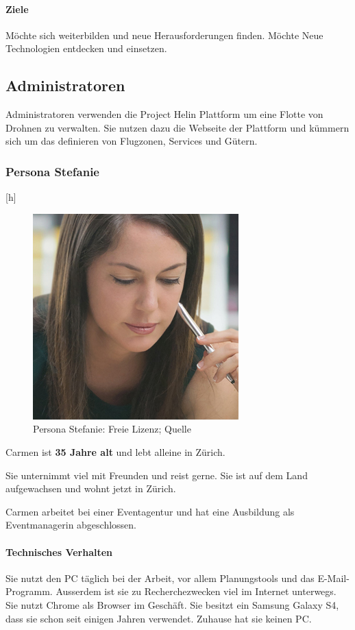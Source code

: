 \paragraph{Ziele} 

Möchte sich weiterbilden und neue Herausforderungen finden. Möchte Neue Technologien entdecken und einsetzen.\\

\subsection{Administratoren}

Administratoren verwenden die Project Helin Plattform um eine Flotte von Drohnen zu verwalten. Sie nutzen dazu die Webseite der Plattform und kümmern sich um das definieren von Flugzonen, Services und Gütern.

\subsubsection{Persona Stefanie}[h]
\begin{figure}
	\includegraphics[width=.35\textwidth]{images/persona-stefanie.jpg} 
	\caption{Persona Stefanie: Freie Lizenz; Quelle} %
	\label{fig:stefanie}
\end{figure}


Carmen ist \textbf{35 Jahre alt} und lebt alleine in Zürich.

Sie unternimmt viel mit Freunden und reist gerne. Sie ist auf dem Land aufgewachsen und wohnt jetzt in Zürich. 

Carmen arbeitet bei einer Eventagentur und hat eine Ausbildung als Eventmanagerin abgeschlossen.

\paragraph{Technisches Verhalten} 
Sie nutzt den PC täglich bei der Arbeit, vor allem Planungstools und das E-Mail-Programm. Ausserdem ist sie zu Recherchezwecken viel im Internet unterwegs. Sie nutzt Chrome als Browser im Geschäft. Sie besitzt ein Samsung Galaxy S4, dass sie schon seit einigen Jahren verwendet. Zuhause hat sie keinen PC.

